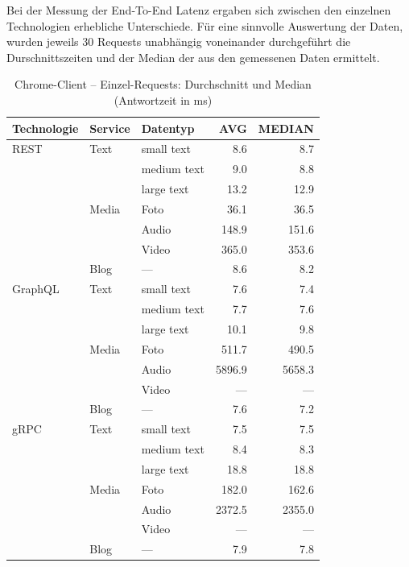Bei der Messung der End-To-End Latenz ergaben sich zwischen den einzelnen Technologien erhebliche Unterschiede. 
Für eine sinnvolle Auswertung der Daten, wurden jeweils 30 Requests unabhängig voneinander durchgeführt die Durschnittszeiten und der Median der aus den gemessenen Daten ermittelt. 

\begin{table}[h]
	\centering
	\caption{Chrome-Client – Einzel-Requests: Durchschnitt und Median (Antwortzeit in ms)}
	\label{tab:chrome-single-avg}
	\renewcommand{\arraystretch}{1.1}
	\begin{tabular}{|l|l|l|r|r|}
		\hline
		\textbf{Technologie} & \textbf{Service} & \textbf{Datentyp} & \textbf{AVG} & \textbf{MEDIAN} \\
		\hline
		REST & Text  & small text  & 8.6 & 8.7 \\
		&       & medium text & 9.0 & 8.8 \\
		&       & large text  & 13.2 & 12.9 \\
		& Media & Foto        & 36.1 & 36.5 \\
		&       & Audio       & 148.9 & 151.6 \\
		&       & Video       & 365.0 & 353.6 \\
		& Blog  & —           & 8.6 & 8.2 \\
		\hline
		GraphQL & Text  & small text  & 7.6 & 7.4 \\
		&       & medium text & 7.7 & 7.6 \\
		&       & large text  & 10.1 & 9.8 \\
		& Media & Foto        & 511.7 & 490.5 \\
		&       & Audio       & 5896.9 & 5658.3 \\
		&       & Video       & — & — \\
		& Blog  & —           & 7.6 & 7.2 \\
		\hline
		gRPC & Text  & small text  & 7.5 & 7.5 \\
		&       & medium text & 8.4 & 8.3 \\
		&       & large text  & 18.8 & 18.8 \\
		& Media & Foto        & 182.0 & 162.6 \\
		&       & Audio       & 2372.5 & 2355.0 \\
		&       & Video       & — & — \\
		& Blog  & —           & 7.9 & 7.8 \\
		\hline
	\end{tabular}
\end{table}


